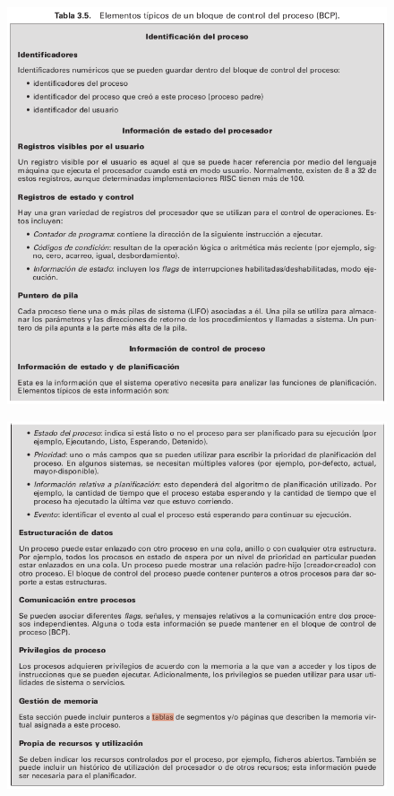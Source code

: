 \documentclass{article}
\begin{document}
\begin{itemize}
\begin{figure}[h]
\centering
\includegraphics[scale=1, width=\textwidth]{pcb1.png}
\end{figure}
\begin{figure}[h]
\centering
\includegraphics[scale=1, width=\textwidth]{pcb2.png}
\end{figure}
\end{itemize}
\end{document}
